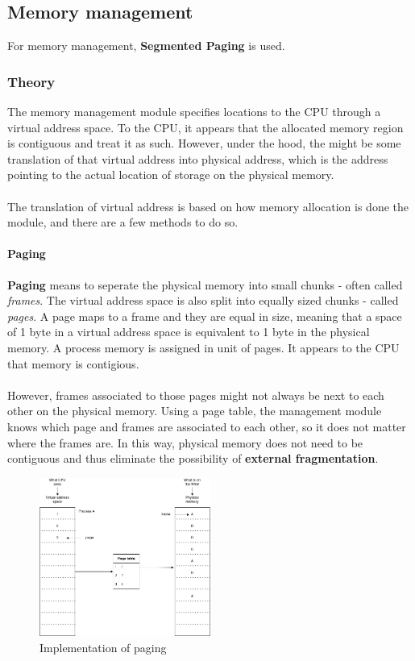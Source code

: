 \documentclass[]{article}
\begin{document}
\newpage
\subsection{Memory management}
For memory management, \textbf{Segmented Paging} is used.
\subsubsection{Theory}
The memory management module specifies locations to the CPU through a virtual address space. To the CPU, it appears that the allocated memory region is contiguous and treat it as such. However, under the hood, the might be some translation of that virtual address into physical address, which is the address pointing to the actual location of storage on the physical memory.\\
\\
The translation of virtual address is based on how memory allocation is done the module, and there are a few methods to do so.
\paragraph{Paging}
\textbf{Paging} means to seperate the physical memory into small chunks - often called \textit{frames}. The virtual address space is also split into equally sized chunks - called \textit{pages}. A page maps to a frame and they are equal in size, meaning that a space of 1 byte in a virtual address space is equivalent to 1 byte in the physical memory. A process memory is assigned in unit of pages. It appears to the CPU that memory is contigious.\\
\\
However, frames associated to those pages might not always be next to each other on the physical memory. Using a page table, the management module knows which page and frames are associated to each other, so it does not matter where the frames are. In this way, physical memory does not need to be contiguous and thus eliminate the possibility of \textbf{external fragmentation}.
\begin{figure}[h]
	\caption{Implementation of paging}
	\centering
	\vspace*{5mm}
	\includegraphics[width=0.5\textwidth]{content/paging.png}
\end{figure}
\end{document}

